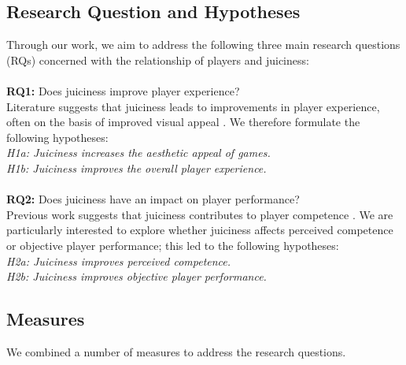 \documentclass{sigchi}
\begin{document}
\subsection{Research Question and Hypotheses}
Through our work, we aim to address the following three main research questions (RQs) concerned with the relationship of players and juiciness: 
\\\\
\textbf{RQ1:} Does juiciness improve player experience?
\\
Literature suggests that juiciness leads to improvements in player experience, often on the basis of improved visual appeal \cite{swink2008game,juul2010casual}. We therefore formulate the following hypotheses:
\\
\textit{H1a: Juiciness increases the aesthetic appeal of games.}
\\
\textit{H1b: Juiciness improves the overall player experience.}
\\
\\
\textbf{RQ2:} Does juiciness have an impact on player performance? 
\\
Previous work suggests that juiciness contributes to player competence \cite{deterding2015lens}. We are particularly interested to explore whether juiciness affects perceived competence or objective player performance; this led to the following hypotheses:
\\
\textit{H2a: Juiciness improves perceived competence.}
\\
\textit{H2b: Juiciness improves objective player performance.}
\\
\subsection{Measures}
We combined a number of measures to address the research questions.
\end{document}

